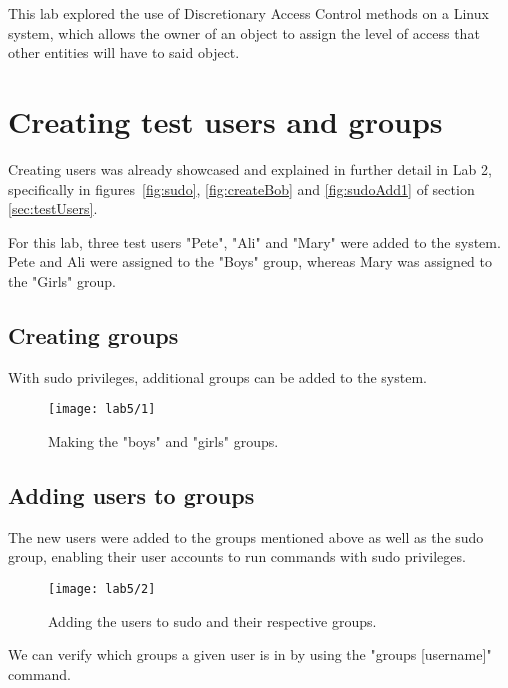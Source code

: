 This lab explored the use of Discretionary Access Control methods on a Linux system, which allows
the owner of an object to assign the level of access that other entities will have to said object.

\section{Creating test users and groups}\label{sec:creating-test-users}

\begin{tcolorbox}[colback=orange!5!white,colframe=orange!75!black,title=Note]
    Creating users was already showcased and explained in
    further detail in Lab 2, specifically in figures~\ref{fig:sudo}, \ref{fig:createBob}
    and \ref{fig:sudoAdd1} of section \ref{sec:testUsers}.
\end{tcolorbox}

\noindent For this lab, three test users "Pete", "Ali" and "Mary" were added to the system.
Pete and Ali were assigned to the "Boys" group, whereas Mary was assigned to the "Girls" group.

\subsection{Creating groups}\label{subsec:creating-groups}
With sudo privileges, additional groups can be added to the system.

\begin{figure}[H]
    \centering
    \texttt{[image: lab5/1]}
    \caption{Making the "boys" and "girls" groups.}
    \label{fig:addgroup}
\end{figure}

\subsection{Adding users to groups}\label{subsec:adding-users-to-groups}

The new users were added to the groups mentioned above as well as the sudo group, enabling
their user accounts to run commands with sudo privileges.

\begin{figure}[H]
    \centering
    \texttt{[image: lab5/2]}
    \caption{Adding the users to sudo and their respective groups.}
    \label{fig:addToGroup}
\end{figure}

We can verify which groups a given user is in by using the "groups [username]" command.

